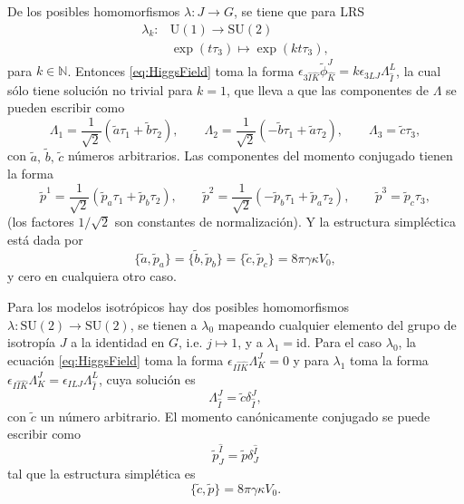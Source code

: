 De los posibles homomorfismos $\lambda: J \longrightarrow G$, se tiene que para LRS
%
\begin{align*}
\lambda_{k}: & \mathrm{U}(1) \longrightarrow \mathrm{SU}(2) \\
& \exp(t \tau_{3}) \longmapsto \exp(k t \tau_{3}),
\end{align*}
%
para $k \in \mathbb{N}$. Entonces \eqref{eq:HiggsField} toma la forma $\epsilon_{3 \hat{I} \hat{K}} \tilde{\phi}^{J}_{\hat{K}} = k \epsilon_{3LJ} \Lambda^{L}_{\hat{I}}$, la cual s\'{o}lo tiene soluci\'{o}n no trivial para $k = 1$, que lleva a que las componentes de $\Lambda$ se pueden escribir como
%
\begin{equation}
\Lambda_{1} = \frac{1}{\sqrt{2}} \left(\tilde{a} \tau_{1} + \tilde{b} \tau_{2} \right), \qquad
\Lambda_{2} = \frac{1}{\sqrt{2}} \left(-\tilde{b} \tau_{1} + \tilde{a} \tau_{2} \right), \qquad
\Lambda_{3} = \tilde{c} \tau_{3},
\end{equation}
%
con $\tilde{a}, \, \tilde{b}, \, \tilde{c}$ n\'{u}meros arbitrarios. Las componentes del momento conjugado tienen la forma
%
\begin{equation}
\tilde{p}^{1} = \frac{1}{\sqrt{2}} \left(\tilde{p}_{a} \tau_{1} + \tilde{p}_{b} \tau_{2} \right), \qquad
\tilde{p}^{2} = \frac{1}{\sqrt{2}} \left(-\tilde{p}_{b} \tau_{1} + \tilde{p}_{a} \tau_{2} \right), \qquad
\tilde{p}^{3} = \tilde{p}_{c} \tau_{3},
\end{equation}
%
(los factores $1/\sqrt{2}$ son constantes de normalizaci\'{o}n). Y la estructura simpl\'{e}ctica est\'{a} dada por
%
\begin{equation}
\{\tilde{a}, \tilde{p}_{a}\} = \{\tilde{b}, \tilde{p}_{b}\} = \{\tilde{c}, \tilde{p}_{c}\} = 8 \pi \gamma \kappa V_{0},
\end{equation}
%
y cero en cualquiera otro caso.

Para los modelos isotr\'{o}picos hay dos posibles homomorfismos $\lambda: \mathrm{SU}(2) \longrightarrow \mathrm{SU}(2)$, se tienen a $\lambda_{0}$ mapeando cualquier elemento del grupo de isotrop\'{i}a $J$ a la identidad en $G$, i.e. $j \longmapsto 1$, y a $\lambda_{1} = \mathrm{id}$. Para el caso $\lambda_{0}$, la ecuaci\'{o}n \eqref{eq:HiggsField} toma la forma $\epsilon_{I \hat{I} \hat{K}} \Lambda^{J}_{K} = 0$ y para $\lambda_{1}$ toma la forma $\epsilon_{I \hat{I} \hat{K}} \Lambda^{J}_{K} = \epsilon_{ILJ} \Lambda^{L}_{\hat{I}}$, cuya soluci\'{o}n es
%
\begin{equation}
\Lambda^{J}_{\hat{I}} = \tilde{c} \delta^{J}_{\hat{I}},
\end{equation}
%
con $\tilde{c}$ un n\'{u}mero arbitrario. El momento can\'{o}nicamente conjugado se puede escribir como
%
\begin{equation*}
\tilde{p}^{\hat{I}}_{J} = \tilde{p} \delta^{\hat{I}}_{J}
\end{equation*}
%
tal que la estructura simpl\'{e}tica es
%
\begin{equation}
\{\tilde{c}, \tilde{p}\} = 8 \pi \gamma \kappa V_{0}.
\end{equation}

